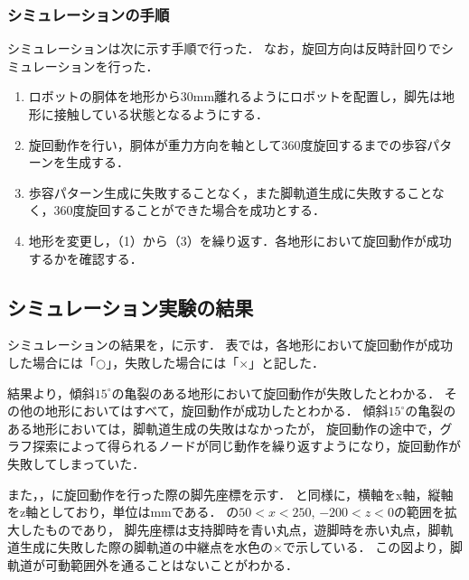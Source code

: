 \subsubsection{シミュレーションの手順}
シミュレーションは次に示す手順で行った．
なお，旋回方向は反時計回りでシミュレーションを行った．
\begin{enumerate}
  \item ロボットの胴体を地形から30mm離れるようにロボットを配置し，脚先は地形に接触している状態となるようにする．
  \item 旋回動作を行い，胴体が重力方向を軸として360度旋回するまでの歩容パターンを生成する．
  \item 歩容パターン生成に失敗することなく，また脚軌道生成に失敗することなく，360度旋回することができた場合を成功とする．
  \item 地形を変更し，（1）から（3）を繰り返す．各地形において旋回動作が成功するかを確認する．
\end{enumerate}

\subsection{シミュレーション実験の結果}
シミュレーションの結果を，に示す．
表では，各地形において旋回動作が成功した場合には「$\bigcirc$」，失敗した場合には「$\times$」と記した．

結果より，傾斜$15^{\circ}$の亀裂のある地形において旋回動作が失敗したとわかる．
その他の地形においてはすべて，旋回動作が成功したとわかる．
傾斜$15^{\circ}$の亀裂のある地形においては，脚軌道生成の失敗はなかったが，
旋回動作の途中で，グラフ探索によって得られるノードが同じ動作を繰り返すようになり，旋回動作が失敗してしまっていた．

また，，に旋回動作を行った際の脚先座標を示す．
と同様に，横軸をx軸，縦軸をz軸としており，単位はmmである．
の$50 < x < 250$, $−200 < z < 0$の範囲を拡大したものであり，
脚先座標は支持脚時を青い丸点，遊脚時を赤い丸点，脚軌道生成に失敗した際の脚軌道の中継点を水色の$\times$で示している．
この図より，脚軌道が可動範囲外を通ることはないことがわかる．
\\

